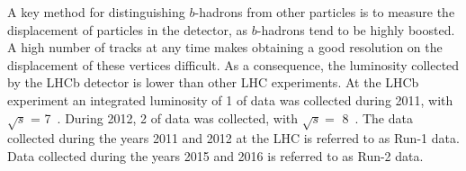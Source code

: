 A key method for distinguishing $b$-hadrons from other particles is to measure the displacement of particles in the detector, as $b$-hadrons tend to be highly boosted. A high number of tracks at any time makes obtaining a good resolution on the displacement of these vertices difficult. As a consequence, the luminosity collected by the LHCb detector is lower than other LHC experiments.  At the LHCb experiment an integrated luminosity of 1 \invfb of data was collected during 2011, with $\sqrt{s}$ = 7~\tev.  During 2012, 2 \invfb of data was collected, with $\sqrt{s} = $ 8~\tev. The data collected during the years 2011 and 2012 at the LHC is referred to as Run-1 data.  Data collected during the years 2015 and 2016 is referred to as Run-2 data.%


   
